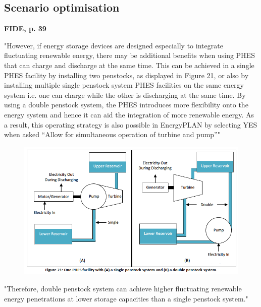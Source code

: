 
















\subsection{Scenario optimisation}


\newpage
\textbf{FIDE, p. 39}

"However, if energy storage devices are
designed especially to integrate fluctuating renewable energy, there may be additional benefits when using
PHES that can charge and discharge at the same time. This can be achieved in a single PHES facility by installing
two penstocks, as displayed in Figure 21, or also by installing multiple single penstock system PHES facilities on
the same energy system i.e. one can charge while the other is discharging at the same time. By using a double
penstock system, the PHES introduces more flexibility onto the energy system and hence it can aid the
integration of more renewable energy. As a result, this operating strategy is also possible in EnergyPLAN by
selecting YES when asked “Allow for simultaneous operation of turbine and pump”"

\begin{figure}[htbp]
	\centering
	\includegraphics[width=\textwidth]{figures/Simultaneous_charge_discharge.png}
\end{figure}

"Therefore, double penstock system can achieve higher fluctuating renewable energy
penetrations at lower storage capacities than a single penstock system."